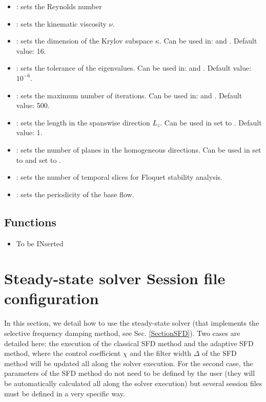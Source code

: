 \begin{itemize}
\item {}: sets the Reynolds number
\item {}: sets the kinematic viscosity $\nu$.
\item {}: sets the dimension of the Krylov subspace $\kappa$. Can be used in:  and . Default value: 16.
\item {}: sets the tolerance of the eigenvalues. Can be used in:  and . Default value: $10^{-6}$.
\item {}: sets the maximum number of iterations. Can be used in:  and . Default value: 500.
\item {}:  sets the length in the spanswise direction $L_z$. Can be used in  set to . Default value: 1.
\item {}: sets the number of planes in the homogeneous directions. Can be used in  set to  and  set to .
\item {}: sets the number of temporal slices for Floquet stability analysis.
\item {}: sets the periodicity of the base flow.
\end{itemize}

\subsection{Functions}
\begin{itemize}
\item To be INserted
\end{itemize}

\section{Steady-state solver Session file configuration}
\label{SectionSFD_XML}

In this section, we detail how to use the steady-state solver (that implements the selective frequency damping method, see Sec. \ref{SectionSFD}).
Two cases are detailed here: the execution of the classical SFD method and the adaptive SFD method, where the control coefficient $\chi$ and the filter width $\Delta$ of the SFD method will be updated all along the solver execution. For the second case, the parameters of the SFD method do not need to be defined by the user (they will be automatically calculated all along the solver execution) but several session files must be defined in a very specific way.

